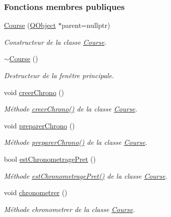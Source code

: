 \subsubsection*{Fonctions membres publiques}
\begin{DoxyCompactItemize}
\item 
\hyperlink{class_course_af6317ecab95f8a2eb205b4f91b530992}{Course} (\hyperlink{class_q_object}{Q\+Object} $\ast$parent=nullptr)
\begin{DoxyCompactList}\small\item\em Constructeur de la classe \hyperlink{class_course}{Course}. \end{DoxyCompactList}\item 
\hyperlink{class_course_aa9038f2e129526920037dda9e76d69d0}{$\sim$\+Course} ()
\begin{DoxyCompactList}\small\item\em Destructeur de la fenêtre principale. \end{DoxyCompactList}\item 
void \hyperlink{class_course_a6eb96222d8dc1f352e28f36e9b414448}{creer\+Chrono} ()
\begin{DoxyCompactList}\small\item\em Méthode \hyperlink{class_course_a6eb96222d8dc1f352e28f36e9b414448}{creer\+Chrono()} de la classe \hyperlink{class_course}{Course}. \end{DoxyCompactList}\item 
void \hyperlink{class_course_a50596f54553b48fa29170a6b42b6e9d4}{preparer\+Chrono} ()
\begin{DoxyCompactList}\small\item\em Méthode \hyperlink{class_course_a50596f54553b48fa29170a6b42b6e9d4}{preparer\+Chrono()} de la classe \hyperlink{class_course}{Course}. \end{DoxyCompactList}\item 
bool \hyperlink{class_course_a44a14d431bd64a507f2c2aa5f465b1b0}{est\+Chronometrage\+Pret} ()
\begin{DoxyCompactList}\small\item\em Méthode \hyperlink{class_course_a44a14d431bd64a507f2c2aa5f465b1b0}{est\+Chronometrage\+Pret()} de la classe \hyperlink{class_course}{Course}. \end{DoxyCompactList}\item 
void \hyperlink{class_course_a589447dd63dca89395119ffd4e4a8c8c}{chronometrer} ()
\begin{DoxyCompactList}\small\item\em Méthode chronometrer de la classe \hyperlink{class_course}{Course}. \end{DoxyCompactList}\item 

\end{DoxyCompactItemize}
